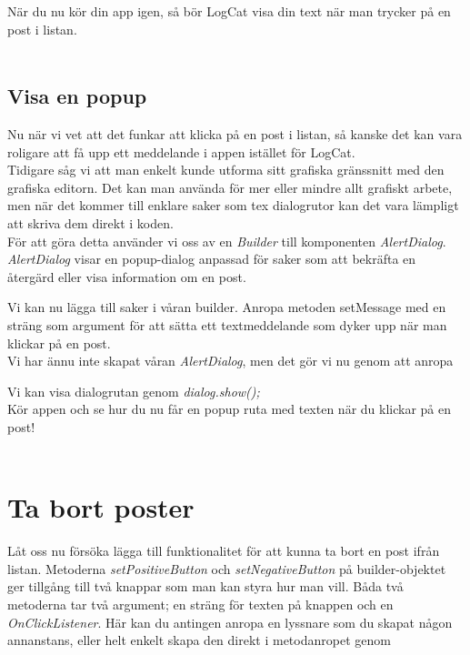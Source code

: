 \documentclass[11 pt, titlepage]{article} %
\begin{document}
När du nu kör din app igen, så bör LogCat visa din text när man trycker på en post i listan.\\ \\

\subsection{Visa en popup}
Nu när vi vet att det funkar att klicka på en post i listan, så kanske det kan vara roligare att få upp ett meddelande i appen istället för LogCat.\\

Tidigare såg vi att man enkelt kunde utforma sitt grafiska gränssnitt med den grafiska editorn.
Det kan man använda för mer eller mindre allt grafiskt arbete, men när det kommer till enklare saker som tex dialogrutor kan det vara lämpligt att skriva dem direkt i koden.\\

För att göra detta använder vi oss av en \textit{Builder} till komponenten \textit{AlertDialog}.
\textit{AlertDialog} visar en popup-dialog anpassad för saker som att bekräfta en återgärd eller visa information om en post.


Vi kan nu lägga till saker i våran builder.
Anropa metoden setMessage med en sträng som argument för att sätta ett textmeddelande som dyker upp när man klickar på en post.\\

Vi har ännu inte skapat våran \textit{AlertDialog}, men det gör vi nu genom att anropa

Vi kan visa dialogrutan genom \textit{dialog.show();}\\

Kör appen och se hur du nu får en popup ruta med texten när du klickar på en post!\\ \\

\section{Ta bort poster}
Låt oss nu försöka lägga till funktionalitet för att kunna ta bort en post ifrån listan.
Metoderna \textit{setPositiveButton} och \textit{setNegativeButton} på builder-objektet ger tillgång till två knappar som man kan styra hur man vill.
Båda två metoderna tar två argument; en sträng för texten på knappen och en \textit{OnClickListener}.
Här kan du antingen anropa en lyssnare som du skapat någon annanstans, eller helt enkelt skapa den direkt i metodanropet genom

\end{document}
